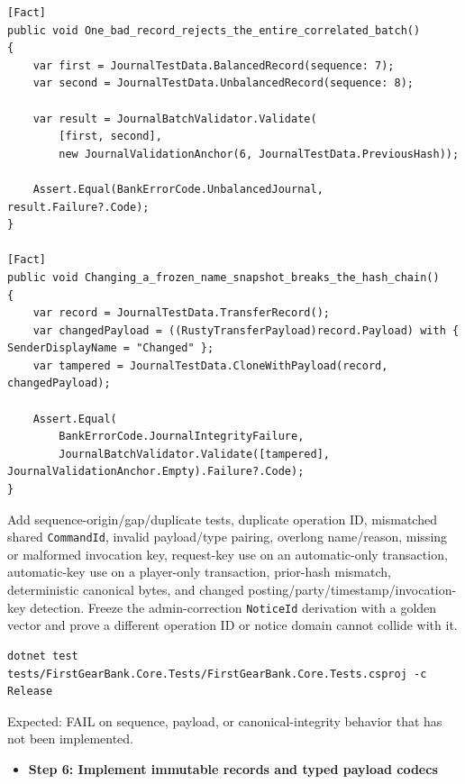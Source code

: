 \documentclass[
  10pt,
  letterpaper,
]{article}
\newcommand{\passthrough}[1]{#1}
\providecommand{\tightlist}{%
  \setlength{\itemsep}{0pt}\setlength{\parskip}{0pt}}
\begin{document}
\begin{lstlisting}
[Fact]
public void One_bad_record_rejects_the_entire_correlated_batch()
{
    var first = JournalTestData.BalancedRecord(sequence: 7);
    var second = JournalTestData.UnbalancedRecord(sequence: 8);

    var result = JournalBatchValidator.Validate(
        [first, second],
        new JournalValidationAnchor(6, JournalTestData.PreviousHash));

    Assert.Equal(BankErrorCode.UnbalancedJournal, result.Failure?.Code);
}

[Fact]
public void Changing_a_frozen_name_snapshot_breaks_the_hash_chain()
{
    var record = JournalTestData.TransferRecord();
    var changedPayload = ((RustyTransferPayload)record.Payload) with { SenderDisplayName = "Changed" };
    var tampered = JournalTestData.CloneWithPayload(record, changedPayload);

    Assert.Equal(
        BankErrorCode.JournalIntegrityFailure,
        JournalBatchValidator.Validate([tampered], JournalValidationAnchor.Empty).Failure?.Code);
}
\end{lstlisting}

Add sequence-origin/\allowbreak{}gap/\allowbreak{}duplicate tests,
duplicate operation ID, mismatched shared
\passthrough{\lstinline!CommandId!}, invalid payload/type pairing,
overlong name/reason, missing or malformed invocation key, request-key
use on an automatic-only transaction, automatic-key use on a player-only
transaction, prior-hash mismatch, deterministic canonical bytes, and
changed
posting/\allowbreak{}party/\allowbreak{}timestamp/\allowbreak{}invocation-key
detection. Freeze the admin-correction
\passthrough{\lstinline!NoticeId!} derivation with a golden vector and
prove a different operation ID or notice domain cannot collide with it.

\begin{lstlisting}
dotnet test tests/FirstGearBank.Core.Tests/FirstGearBank.Core.Tests.csproj -c Release
\end{lstlisting}

Expected: FAIL on sequence, payload, or canonical-integrity behavior
that has not been implemented.

\begin{itemize}
\tightlist
\item[$\square$]
  \textbf{Step 6: Implement immutable records and typed payload codecs}
\end{itemize}
\end{document}
